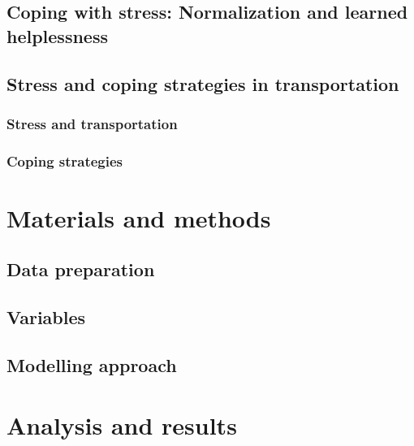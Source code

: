 \documentclass[
11pt, %
oneside, %
english, %
singlespacing, %
]{macthesis} %
\begin{document}
\hypertarget{coping-with-stress-normalization-and-learned-helplessness}{%
\subsection{Coping with stress: Normalization and learned helplessness}\label{coping-with-stress-normalization-and-learned-helplessness}}

\hypertarget{stress-and-coping-strategies-in-transportation}{%
\subsection{Stress and coping strategies in transportation}\label{stress-and-coping-strategies-in-transportation}}

\hypertarget{stress-and-transportation-1}{%
\subsubsection{Stress and transportation}\label{stress-and-transportation-1}}

\hypertarget{coping-strategies}{%
\subsubsection{Coping strategies}\label{coping-strategies}}

\hypertarget{materials-and-methods}{%
\section{Materials and methods}\label{materials-and-methods}}

\hypertarget{data-preparation}{%
\subsection{Data preparation}\label{data-preparation}}

\hypertarget{variables}{%
\subsection{Variables}\label{variables}}

\hypertarget{modelling-approach}{%
\subsection{Modelling approach}\label{modelling-approach}}

\hypertarget{analysis-and-results}{%
\section{Analysis and results}\label{analysis-and-results}}
\end{document}
